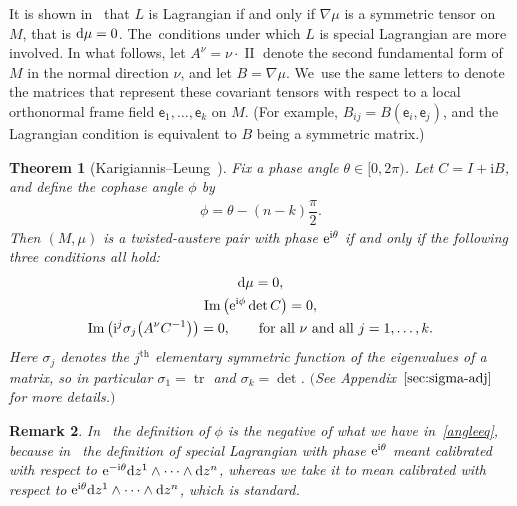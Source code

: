 \documentclass[10pt,a4paper]{amsart}
\def\ve{\mathsf{e}}
\def\ri{\mathrm{i}}
\renewcommand{\Im}{\operatorname{Im}}
\def\II{\operatorname{II}} %
\def\tr{\operatorname{tr}}
\newtheorem{Theorem}{Theorem}[section]
\newtheorem{Remark}[Theorem]{Remark}}
\numberwithin{equation}{section}
\begin{document}
It is shown in~\cite{KL} that $L$ is Lagrangian if and only if $\nabla \mu$ is a symmetric tensor on $M$, that is ${\rm d} \mu = 0$. The~conditions under which $L$ is special Lagrangian are more involved. In what follows, let $A^\nu = \nu \cdot \II$ denote the second fundamental form of $M$ in the normal direction $\nu$, and let $B = \nabla \mu$. We~use the same letters to denote the matrices that represent these covariant tensors with respect to a local orthonormal frame field $\ve_1, \dots, \ve_k$ on $M$. (For example, $B_{ij} = B(\ve_i, \ve_j)$, and the Lagrangian condition
is equivalent to $B$ being a symmetric matrix.)

\begin{Theorem}[Karigiannis--Leung~\cite{KL}] \label{theoremzero}
Fix a \emph{phase angle} $\theta \in [0, 2 \pi)$. Let $C=I + \ri B$, and define the \emph{cophase angle} $\phi$ by
\begin{gather} \label{angleeq}
\phi = \theta - (n-k) \dfrac{\pi}2.
\end{gather}
Then $(M, \mu)$ is a twisted-austere pair with phase ${\rm e}^{\ri \theta}$ if and only if the following three conditions all hold:
\begin{gather} \label{eq:tw1}
{\rm d}\mu = 0,
\\ \label{eq:tw2}
\Im \big({\rm e}^{\ri \phi} \det C \big) = 0,
\\ \label{eq:tw3}
\Im \big( \ri^j \sigma_j \big(A^\nu C^{-1} \big) \big) = 0, \qquad \text{for all $\nu$ and all $j=1, \dots, k$}.
\end{gather}
Here $\sigma_j$ denotes the $j^{\text{th}}$ elementary symmetric function of the eigenvalues of a matrix, so in particular $\sigma_1 = \tr$ and $\sigma_k = \det$. $($See Appendix~$\ref{sec:sigma-adj}$ for more details.$)$
\end{Theorem}

\begin{Remark}
In~\cite[Theorem 2.3]{KL} the definition of $\phi$ is the negative of what we have in~\eqref{angleeq}, because in~\cite{KL} the definition of special Lagrangian with phase ${\rm e}^{\ri \theta}$ meant calibrated with respect to ${\rm e}^{-\ri \theta} {\rm d}z^1 \wedge \cdots \wedge {\rm d}z^n$, whereas we take it to mean calibrated with respect to ${\rm e}^{\ri \theta} {\rm d}z^1 \wedge \cdots \wedge {\rm d}z^n$, which is standard.
\end{Remark}
\end{document}
